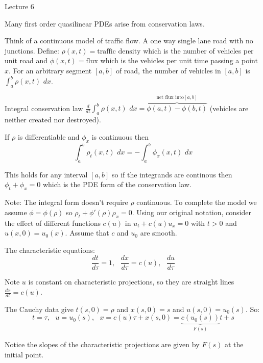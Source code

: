 \begin{center}

Lecture 6

\end{center}

Many first order quasilinear PDEs arise from conservation laws.

Think of a continuous model of traffic flow. A one way single lane road with no junctions. Define: $\rho(x,t) = \text{traffic density}$ which is the number of vehicles per unit road and $\phi(x,t) = \text{flux}$ which is the vehicles per unit time passing a point $x$. For an arbitrary segment $[a,b]$ of road, the number of vehicles in $[a,b]$ is $\int_a^b \rho(x,t) \, \, dx$.

Integral conservation law $\frac{d}{dt} \int_a^b \rho(x,t) \, \, dx = \overbrace{\phi(a,t) - \phi(b,t)}^{\text{net flux into} [a,b]}$ (vehicles are neither created nor destroyed).

If $\rho$ is differentiable and $\phi_x$ is continuous then $$\int_a^b \rho_t (x,t) \,\, dx = - \int_a^b \phi_x (x,t) \, \, dx$$

This holds for any interval $[a,b]$ so if the integrands are continous then $\phi_t + \phi_x = 0$ which is the PDE form of the conservation law.

Note: The integral form doesn't require $\rho$ continuous. To complete the model we assume $\phi = \phi(\rho)$ so $\rho_t + \phi'(\rho)\rho_x = 0$. Using our original notation, consider the effect of different functions $c(u)$ in $u_t + c(u) u_x = 0$ with $t>0$ and $u(x,0) = u_0 (x)$. Assume that $c$ and $u_0$ are smooth.

The characteristic equations: $$\frac{dt}{d\tau} = 1, \, \, \, \, \frac{dx}{d\tau} = c(u), \,\,\,\, \frac{du}{d\tau}$$

Note $u$ is constant on characteristic projections, so they are straight lines $\frac{dx}{dt} = c(u)$.

The Cauchy data give $t(s,0) = \rho$ and $x(s,0) = s$ and $u(s,0) = u_0 (s)$. So:
$$t= \tau , \,\,\,\, u = u_0 (s), \,\,\,\, x = c(u) \tau + x(s,0) = \underbrace{c(u_0(s))}_{F(s)} t + s$$

Notice the slopes of the characteristic projections are given by $F(s)$ at the initial point.

